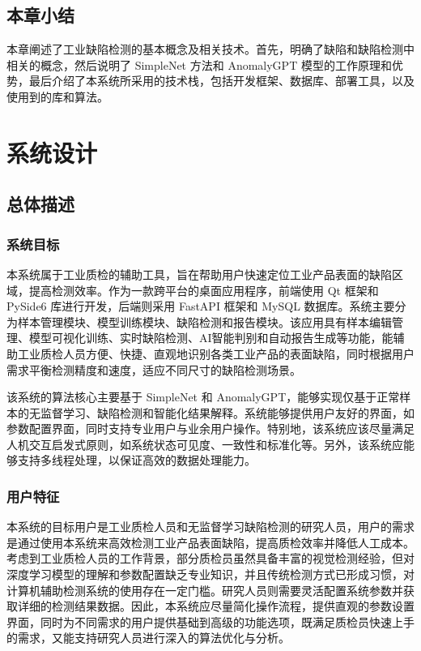 \documentclass[
  ]{njuthesis}
\begin{document}
\section{本章小结}

本章阐述了工业缺陷检测的基本概念及相关技术。首先，明确了缺陷和缺陷检测中相关的概念，然后说明了 SimpleNet 方法和 AnomalyGPT 模型的工作原理和优势，最后介绍了本系统所采用的技术栈，包括开发框架、数据库、部署工具，以及使用到的库和算法。

\chapter{系统设计}

\section{总体描述}

\subsection{系统目标}

本系统属于工业质检的辅助工具，旨在帮助用户快速定位工业产品表面的缺陷区域，提高检测效率。作为一款跨平台的桌面应用程序，前端使用 Qt 框架和 PySide6 库进行开发，后端则采用 FastAPI 框架和 MySQL 数据库。系统主要分为样本管理模块、模型训练模块、缺陷检测和报告模块。该应用具有样本编辑管理、模型可视化训练、实时缺陷检测、AI智能判别和自动报告生成等功能，能辅助工业质检人员方便、快捷、直观地识别各类工业产品的表面缺陷，同时根据用户需求平衡检测精度和速度，适应不同尺寸的缺陷检测场景。

该系统的算法核心主要基于 SimpleNet 和 AnomalyGPT，能够实现仅基于正常样本的无监督学习、缺陷检测和智能化结果解释。系统能够提供用户友好的界面，如参数配置界面，同时支持专业用户与业余用户操作。特别地，该系统应该尽量满足人机交互启发式原则，如系统状态可见度、一致性和标准化等。另外，该系统应能够支持多线程处理，以保证高效的数据处理能力。

\subsection{用户特征}

本系统的目标用户是工业质检人员和无监督学习缺陷检测的研究人员，用户的需求是通过使用本系统来高效检测工业产品表面缺陷，提高质检效率并降低人工成本。考虑到工业质检人员的工作背景，部分质检员虽然具备丰富的视觉检测经验，但对深度学习模型的理解和参数配置缺乏专业知识，并且传统检测方式已形成习惯，对计算机辅助检测系统的使用存在一定门槛。研究人员则需要灵活配置系统参数并获取详细的检测结果数据。因此，本系统应尽量简化操作流程，提供直观的参数设置界面，同时为不同需求的用户提供基础到高级的功能选项，既满足质检员快速上手的需求，又能支持研究人员进行深入的算法优化与分析。
\end{document}
